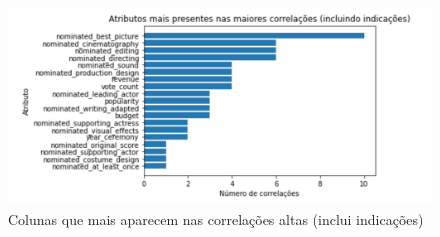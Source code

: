 
            \begin{figure}[htb]
            	\caption{\label{colunas_influentes_1}Colunas que mais aparecem nas correlações altas (inclui indicações)}
            	\begin{center}
            		\includegraphics[scale=0.7]{colunas_influentes_1.png}
            	\end{center}
            \end{figure}

            

